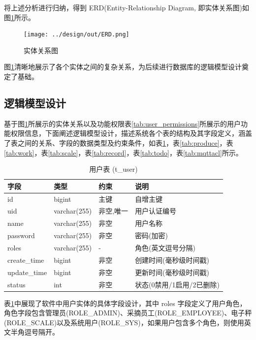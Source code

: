将上述分析进行归纳，得到 ERD(Entity-Relationship Diagram, 即实体关系图)如图\ref{fig:ERD}所示。

\begin{figure}[H]
    \centering
    \texttt{[image: ../design/out/ERD.png]}
    \caption{实体关系图}
    \label{fig:ERD}
\end{figure}

图\ref{fig:ERD}清晰地展示了各个实体之间的复杂关系，为后续进行数据库的逻辑模型设计奠定了基础。

\subsection{逻辑模型设计}

基于图\ref{fig:ERD}所展示的实体关系以及功能权限表\ref{tab:user_permissions}所展示的用户功能权限信息，下面阐述逻辑模型设计，描述系统各个表的结构及其字段定义，涵盖了表之间的关系、字段的数据类型及约束条件，如表\ref{tab:user}，表\ref{tab:produce}，表\ref{tab:work}，表\ref{tab:scale}，表\ref{tab:record}，表\ref{tab:todo}，表\ref{tab:mqttacl}所示。

\begin{table}[H]
    \centering
    \caption{用户表 (t\_user)}
    \label{tab:user}
    \begin{tabular}{|l|l|l|l|}
    \hline
    字段 & 类型 & 约束 & 说明 \\
    \hline
    id & bigint & 主键 & 自增主键 \\
    uid & varchar(255) & 非空,唯一 & 用户认证编号 \\
    name & varchar(255) & 非空 & 用户名称 \\
    password & varchar(255) & 非空 & 密码(加密) \\
    roles & varchar(255) & - & 角色(英文逗号分隔) \\
    create\_time & bigint & 非空 & 创建时间(毫秒级时间戳) \\
    update\_time & bigint & 非空 & 更新时间(毫秒级时间戳) \\
    status & int & 非空 & 状态(0禁用/1启用/2已删除) \\
    \hline
    \end{tabular}
    \end{table}

表\ref{tab:user}中展现了软件中用户实体的具体字段设计，其中 roles 字段定义了用户角色，角色字段包含管理员(ROLE\_ADMIN)、采摘员工(ROLE\_EMPLOYEE)、电子秤(ROLE\_SCALE)以及系统用户(ROLE\_SYS)，如果用户包含多个角色，则使用英文半角逗号隔开。

